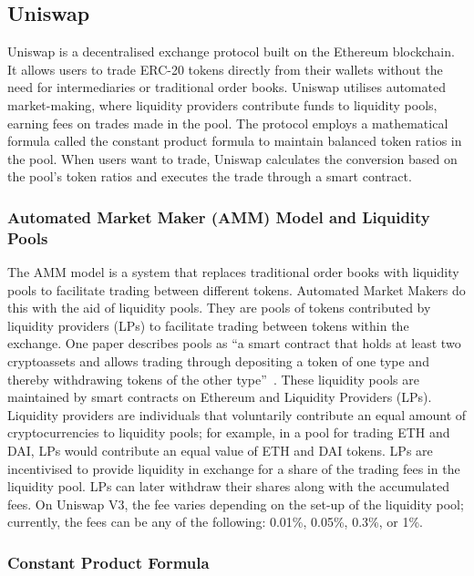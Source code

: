 \subsection{Uniswap}

Uniswap is a decentralised exchange protocol built on the Ethereum blockchain. It allows users to trade ERC-20 tokens directly from their wallets without the need for intermediaries or traditional order books. Uniswap utilises automated market-making, where liquidity providers contribute funds to liquidity pools, earning fees on trades made in the pool. The protocol employs a mathematical formula called the constant product formula to maintain balanced token ratios in the pool. When users want to trade, Uniswap calculates the conversion based on the pool's token ratios and executes the trade through a smart contract.

\subsubsection{Automated Market Maker (AMM) Model and Liquidity Pools}

The AMM model is a system that replaces traditional order books with liquidity pools to facilitate trading between different tokens. Automated Market Makers do this with the aid of liquidity pools. They are pools of tokens contributed by liquidity providers (LPs) to facilitate trading between tokens within the exchange. One paper describes pools as ``a smart contract that holds at least two cryptoassets and allows trading through depositing a token of one type and thereby withdrawing tokens of the other type''~\cite{schar2021decentralized}. These liquidity pools are maintained by smart contracts on Ethereum and Liquidity Providers (LPs). Liquidity providers are individuals that voluntarily contribute an equal amount of cryptocurrencies to liquidity pools; for example, in a pool for trading ETH and DAI, LPs would contribute an equal value of ETH and DAI tokens. LPs are incentivised to provide liquidity in exchange for a share of the trading fees in the liquidity pool. LPs can later withdraw their shares along with the accumulated fees. On Uniswap V3, the fee varies depending on the set-up of the liquidity pool; currently, the fees can be any of the following: 0.01\%, 0.05\%, 0.3\%, or 1\%.

\subsubsection{Constant Product Formula}

